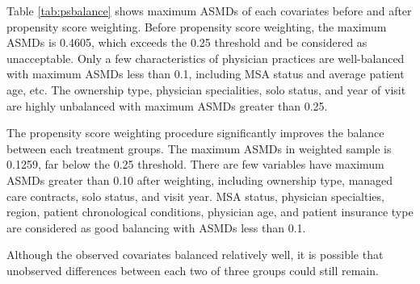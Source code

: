 \documentclass[12pt]{report}
\begin{document}
Table \ref{tab:psbalance} shows maximum ASMDs of each covariates before and after propensity score weighting. Before propensity score weighting, the maximum ASMDs is 0.4605, which exceeds the 0.25 threshold and be considered as unacceptable. Only a few characteristics of physician practices are well-balanced with maximum ASMDs less than 0.1, including MSA status and average patient age, etc. The ownership type, physician specialities, solo status, and year of visit are highly unbalanced with maximum ASMDs greater than 0.25. 

The propensity score weighting procedure significantly improves the balance between each treatment groups. The maximum ASMDs in weighted sample is 0.1259, far below the 0.25 threshold. There are few variables have maximum ASMDs greater than 0.10 after weighting, including ownership type, managed care contracts, solo status, and visit year. MSA status, physician specialties, region, patient chronological conditions, physician age, and patient insurance type are considered as good balancing with ASMDs less than 0.1.



Although the observed covariates balanced relatively well, it is possible that unobserved differences between each two of three groups could still remain.
\end{document}
